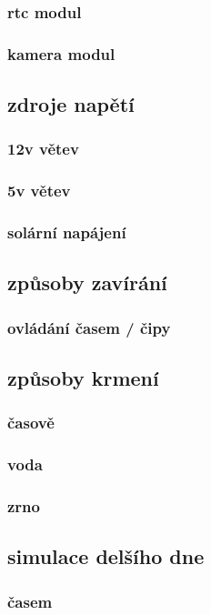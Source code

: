 \documentclass[
program=itp,
  biblatex,
  figures=false,
  glossaries,
  index
]{kidiplom}
\begin{document}
\subsubsection{rtc modul}
\subsubsection{kamera modul}

\subsection{zdroje napětí}
\subsubsection{12v větev}
\subsubsection{5v větev}
\subsubsection{solární napájení}

\subsection{způsoby zavírání}
\subsubsection{ovládání časem / čipy}
\subsection{způsoby krmení}
\subsubsection{časově}
\subsubsection{voda}
\subsubsection{zrno}

\subsection{simulace delšího dne}
\subsubsection{časem}
\end{document}
